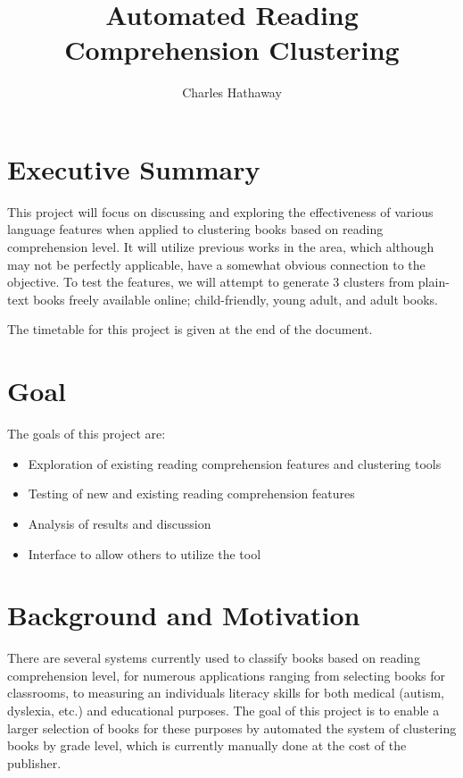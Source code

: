 \documentclass[]{article}
\title{Automated Reading Comprehension Clustering}
\author{Charles Hathaway}
\begin{document}
\maketitle

\section{Executive Summary}

This project will focus on discussing and exploring the effectiveness of various language features when applied to clustering books based on reading comprehension level.
It will utilize previous works in the area, which although may not be perfectly applicable, have a somewhat obvious connection to the objective.
To test the features, we will attempt to generate 3 clusters from plain-text books freely available online; child-friendly, young adult, and adult books.

The timetable for this project is given at the end of the document.

\section{Goal}

The goals of this project are:
\begin{itemize}
	\item Exploration of existing reading comprehension features and clustering tools
	\item Testing of new and existing reading comprehension features
	\item Analysis of results and discussion
	\item Interface to allow others to utilize the tool
\end{itemize}

\section{Background and Motivation}

There are several systems currently used to classify books based on reading comprehension level, for numerous applications ranging from selecting books for classrooms, to measuring an individuals literacy skills for both medical (autism, dyslexia, etc.) and educational purposes.
The goal of this project is to enable a larger selection of books for these purposes by automated the system of clustering books by grade level, which is currently manually done at the cost of the publisher.
\end{document}
